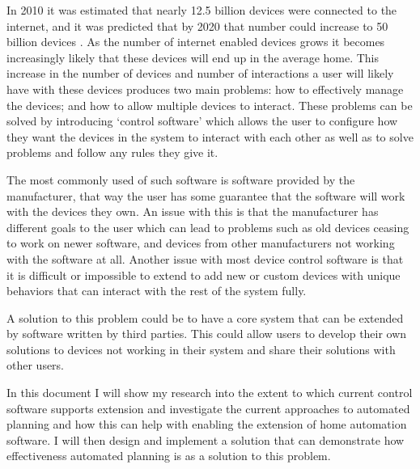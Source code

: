 In 2010 it was estimated that nearly 12.5 billion devices were connected to the
internet, and it was predicted that by 2020 that number could increase to 50
billion devices \citep{Evans2011}. As the number of internet enabled devices
grows it becomes increasingly likely that these devices will end up in the
average home. This increase in the number of devices and number of interactions
a user will likely have with these devices produces two main problems: how to
effectively manage the devices; and how to allow multiple devices to interact.
These problems can be solved by introducing `control software' which allows the
user to configure how they want the devices in the system to interact with each
other as well as to solve problems and follow any rules they give it.

The most commonly used of such software is software provided by the
manufacturer, that way the user has some guarantee that the software will work
with the devices they own. An issue with this is that the manufacturer has
different goals to the user which can lead to problems such as old devices
ceasing to work on newer software, and devices from other manufacturers not
working with the software at all. Another issue with most device control
software is that it is difficult or impossible to extend to add new or custom
devices with unique behaviors that can interact with the rest of the system
fully.

A solution to this problem could be to have a core system that can be extended
by software written by third parties. This could allow users to develop their
own solutions to devices not working in their system and share their solutions
with other users.

In this document I will show my research into the extent to which current
control software supports extension and investigate the current approaches to
automated planning and how this can help with enabling the extension of home
automation software. I will then design and implement a solution that can
demonstrate how effectiveness automated planning is as a solution to this
problem.


